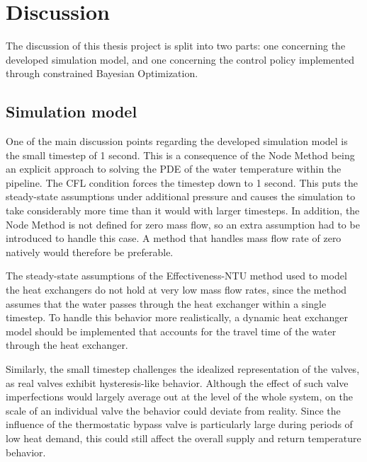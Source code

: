 
\chapter{Discussion}\label{chapter:Discussion}
The discussion of this thesis project is split into two parts: one concerning the developed simulation model, and one concerning the control policy implemented through constrained Bayesian Optimization.

\section{Simulation model}
One of the main discussion points regarding the developed simulation model is the small timestep of 1 second. This is a consequence of the Node Method being an explicit approach to solving the PDE of the water temperature within the pipeline. The CFL condition forces the timestep down to 1 second. This puts the steady-state assumptions under additional pressure and causes the simulation to take considerably more time than it would with larger timesteps. In addition, the Node Method is not defined for zero mass flow, so an extra assumption had to be introduced to handle this case. A method that handles mass flow rate of zero natively would therefore be preferable.

The steady-state assumptions of the Effectiveness-NTU method used to model the heat exchangers do not hold at very low mass flow rates, since the method assumes that the water passes through the heat exchanger within a single timestep. To handle this behavior more realistically, a dynamic heat exchanger model should be implemented that accounts for the travel time of the water through the heat exchanger.

Similarly, the small timestep challenges the idealized representation of the valves, as real valves exhibit hysteresis-like behavior. Although the effect of such valve imperfections would largely average out at the level of the whole system, on the scale of an individual valve the behavior could deviate from reality. Since the influence of the thermostatic bypass valve is particularly large during periods of low heat demand, this could still affect the overall supply and return temperature behavior.

